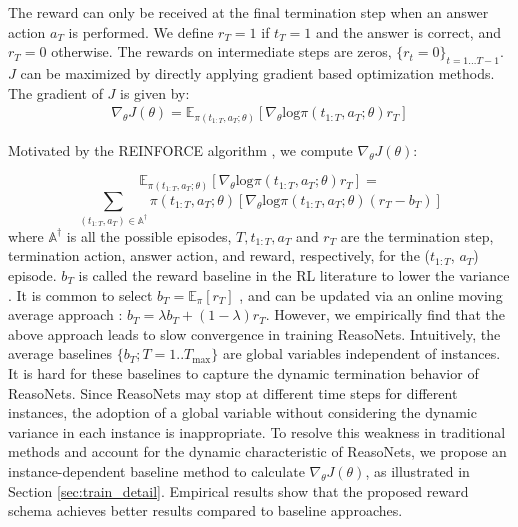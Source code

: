 \documentclass[sigconf]{acmart}
\begin{document}
The reward can only be received at the final termination step when an answer action $a_T$ is performed. We define $r_{T} = 1$ if $t_T = 1$ and the answer is correct, and $r_T = 0$ otherwise. The rewards on intermediate steps are zeros, $\{r_t =0 \}_{t=1 \dots T-1}$.
$J$ can be maximized by directly applying gradient based optimization methods. The gradient of $J$ is given by:
\begin{equation*}
\begin{aligned}
\nabla_{\theta} J(\theta) = \mathbb{E}_{\pi(t_{1:T}, a_T; \theta)} \left[ \nabla_{\theta} \text{log} \pi(t_{1:T}, a_T; \theta)  r_T \right]
\end{aligned}
\end{equation*}

Motivated by the REINFORCE algorithm \citep{williams1992reinforce}, we compute $\nabla_{\theta} J(\theta)$:

\[ \mathbb{E}_{\pi(t_{1:T}, a_T; \theta)} \left[ \nabla_{\theta} \text{log} \pi(t_{1:T}, a_T; \theta)  r_T \right]  = \]
\[ \sum_{(t_{1:T}, a_T) \in \mathbb{A}^\dagger} \pi(t_{1:T}, a_T; \theta)  \left[ \nabla_{\theta} \text{log} \pi(t_{1:T}, a_{T}; \theta) ( r_{T} - b_{T}) \right]   \]
where $\mathbb{A}^\dagger$ is all the possible episodes, $T, t_{1:T}, a_{T} $ and $r_{T}$ are the termination step, termination action, answer action, and reward, respectively, for the ($t_{1:T}$, $a_T$) episode. $b_{T}$ is called the reward baseline in the RL literature to lower the variance \citep{SuttonPhDThesis}. It is common to select $b_{T} = \mathbb{E}_{\pi}\left[r_{T} \right]$ \citep{sutton2001policy}, and can be updated via an online moving average approach : $b_{T} = \lambda b_{T} + (1- \lambda) r_{T}$.
However, we empirically find that the above approach leads to slow convergence in training ReasoNets. Intuitively, the average baselines $\{ b_{T} ; T=1..T_\text{max} \}$ are global variables independent of instances. It is hard for these baselines to capture the dynamic termination behavior of ReasoNets. Since ReasoNets may stop at different time steps for different instances, the adoption of a global variable without considering the dynamic variance in each instance is inappropriate. To resolve this weakness in traditional methods and account for the dynamic characteristic of ReasoNets, we propose an instance-dependent baseline method
to calculate $\nabla_{\theta} J(\theta)$, as illustrated in Section \ref{sec:train_detail}.
Empirical results show that the proposed reward schema achieves better results compared to baseline approaches.
\end{document}
